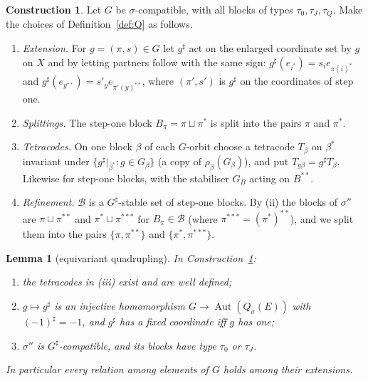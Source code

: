 \documentclass[11pt]{amsart}
\newtheorem{lemma}[theorem]{Lemma}
\theoremstyle{definition}
\newtheorem{construction}[theorem]{Construction}
\newcommand{\Aut}{\operatorname{Aut}}
\newcommand{\cB}{\mathcal{B}}
\begin{document}
\begin{construction}\label{con:eq}
Let $G$ be $\sigma$-compatible, with all blocks of types $\tau_0,\tau_J,\tau_Q$. Make the choices of
Definition~\ref{def:Q} as follows.
\begin{enumerate}
\item[(i)] \emph{Extension.} For $g=(\pi,s)\in G$ let $g^\sharp$ act on the enlarged coordinate set
  by $g$ on $X$ and by letting partners follow with the same sign:
  $g^\sharp(e_{i^*})=s_ie_{\pi(i)^*}$ and $g^\sharp(e_{y^{**}})=s'_ye_{\pi'(y)^{**}}$, where
  $(\pi',s')$ is $g^\sharp$ on the coordinates of step one.
\item[(ii)] \emph{Splittings.} The step-one block $B_\pi=\pi\sqcup\pi^*$ is split into the pairs $\pi$
  and $\pi^*$.
\item[(iii)] \emph{Tetracodes.} On one block $\beta$ of each $G$-orbit choose a tetracode $T_\beta$
  on $\beta^*$ invariant under $\{g^\sharp|_{\beta^*}:g\in G_\beta\}$ (a copy of
  $\rho_\beta(G_\beta)$), and put $T_{g\beta}=g^\sharp T_\beta$. Likewise for step-one blocks, with
  the stabiliser $G_B$ acting on $B^{**}$.
\item[(iv)] \emph{Refinement.} $\cB$ is a $G^\sharp$-stable set of step-one blocks. By (ii) the
  blocks of $\sigma''$ are $\pi\sqcup\pi^{**}$ and $\pi^*\sqcup\pi^{***}$ for $B_\pi\in\cB$ (where
  $\pi^{***}=(\pi^*)^{**}$), and we split them into the pairs $\{\pi,\pi^{**}\}$ and
  $\{\pi^*,\pi^{***}\}$.
\end{enumerate}
\end{construction}

\begin{lemma}[equivariant quadrupling]\label{lem:eq}
In Construction~\ref{con:eq}:
\begin{enumerate}
\item the tetracodes in (iii) exist and are well defined;
\item $g\mapsto g^\sharp$ is an injective homomorphism $G\to\Aut(Q_\sigma(E))$ with $(-1)^\sharp=-1$,
  and $g^\sharp$ has a fixed coordinate iff $g$ has one;
\item $\sigma''$ is $G^\sharp$-compatible, and its blocks have type $\tau_0$ or $\tau_J$.
\end{enumerate}
In particular every relation among elements of $G$ holds among their extensions.
\end{lemma}
\end{document}
